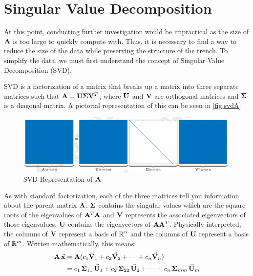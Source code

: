 
\section{Singular Value Decomposition}  \label{sec:svd}
At this point, conducting further investigation would be impractical as the size of $\mathbf{A}$ is too large to quickly compute with. Thus, it is necessary to find a way to reduce the size of the data while preserving the structure of the trench. To simplify the data, we must first understand the concept of Singular Value Decomposition (SVD). 


SVD is a factorization of a matrix that breaks up a matrix into three separate matrices such that $\mathbf{A} = \mathbf{U}\mathbf{\Sigma}\mathbf{V}^T$, where $\mathbf{U}$ and $\mathbf{V}$ are orthogonal matrices and $\mathbf{\Sigma}$ is a diagonal matrix. A pictorial representation of this can be seen in \autoref{fig:svdA}
\begin{figure}[H]
    \centering
    \includegraphics[width=\textwidth]{./imgs/SVD.jpg}
    \caption{SVD Representation of $\operatorname{\mathbf{A}}$}
    \label{fig:svdA}
\end{figure}
 As with standard factorization, each of the three matrices tell you information about the parent matrix $\operatorname{\mathbf{A}}$. $\operatorname{\mathbf{\Sigma}}$  contains the singular values which are the square roots of the eigenvalues of $\mathbf{A}^T\mathbf{A}$ and $\operatorname{\mathbf{V}}$ represents the associated eigenvectors of those eigenvalues. $\operatorname{\mathbf{U}}$ contains the eigenvectors of $\mathbf{A}\mathbf{A}^T$. Physically interpreted,  the columns of $\mathbf{V}$ represent a basis of $\operatorname{\mathbb{R}}^n$ and the columns of $\mathbf{U}$ represent a basis of $\operatorname{\mathbb{R}}^m$. Written mathematically, this means:
 \begin{align*}
     \operatorname{\mathbf{A}}\vec{\mathbf{x}} &= \operatorname{\mathbf{A}}( c_1\vec{\mathbf{V}}_1 + c_2\vec{\mathbf{V}}_2 + \dots + c_n\vec{\mathbf{V}}_n)\\
     &= c_1\operatorname{\mathbf{\Sigma}}_{11}\vec{\mathbf{U}}_1 +  c_2\operatorname{\mathbf{\Sigma}}_{22}\vec{\mathbf{U}}_2 + \dots + c_n\operatorname{\mathbf{\Sigma}}_{mm}\vec{\mathbf{U}}_m 
 \end{align*}
